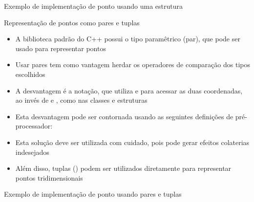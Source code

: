 \begin{frame}[fragile]{Exemplo de implementação de ponto usando uma estrutura}


\end{frame}


\begin{frame}[fragile]{Representação de pontos como pares e tuplas}

    \begin{itemize}
        \item A biblioteca padrão do C++ possui o tipo paramêtrico  (par), que pode
            ser usado para representar pontos
        \pause

        \item Usar pares tem como vantagem herdar os operadores de comparação dos
            tipos escolhidos
        \pause

        \item A desvantagem é a notação, que utiliza  e  para
            acessar as duas coordenadas, ao invés de  e , como nas classes e
estruturas 
        \pause

        \item Esta desvantagem pode ser contornada usando as seguintes definições de 
            pré-processador:
        \pause

        \pause
        \vspace{0.05in}

        \item Esta solução deve ser utilizada com cuidado, pois pode gerar efeitos colaterias
            indesejados
        \pause

        \item Além disso, tuplas () podem ser utilizados diretamente para representar pontos tridimensionais
    \end{itemize}

\end{frame}

\begin{frame}[fragile]{Exemplo de implementação de ponto usando pares e tuplas}
\end{frame}


